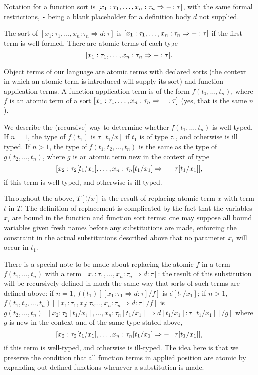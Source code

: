\documentclass[12pt]{article}
\begin{document}
Notation for a function sort is $[x_1:\tau_1,\ldots,x_n:\tau_n \Rightarrow {\tt -}:\tau]$, with the same formal restrictions, {\tt -} being a blank placeholder for a definition body $d$ not supplied.

The sort of $[x_1:\tau_1,\ldots,x_n:\tau_n \Rightarrow d:\tau]$ is $[x_1:\tau_1,\ldots,x_n:\tau_n \Rightarrow {\tt -}:\tau]$ if the first term is well-formed.  There are atomic terms of each type $$[x_1:\tau_1,\ldots,x_n:\tau_n \Rightarrow {\tt -}:\tau].$$

Object terms of our language are atomic terms with declared sorts (the context in which an atomic term is introduced will supply its sort) and function application terms.  A function application term is of the form $f(t_1,\ldots,t_n)$,
where $f$ is an atomic term of a sort $[x_1:\tau_1,\ldots,x_n:\tau_n \Rightarrow {\tt -}:\tau]$ (yes, that is the same $n$).

We describe the (recursive) way to determine whether $f(t_1,\ldots,t_n)$ is well-typed.  If $n=1$,
the type of $f(t_1)$ is $\tau[t_1/x]$ if $t_1$ is of type $\tau_1$, and otherwise is ill typed.  If $n>1$,
the type of $f(t_1,t_2,\ldots,t_n)$ is the same as the type of $g(t_2,\ldots,t_n)$, where $g$ is an atomic term new in the context
of type $$[x_2:\tau_2[t_1/x_1],\ldots,x_n:\tau_n[t_1/x_1]\Rightarrow {\tt -}:\tau[t_1/x_1]],$$ if this term is well-typed, and otherwise is ill-typed.

Throughout the above, $T[t/x]$ is the result of replacing atomic term $x$ with term $t$ in $T$.  The definition of replacement is complicated by the fact that the variables $x_i$ are bound in the function and function sort terms:  one may suppose all bound variables given fresh names before any substitutions are made, enforcing the constraint in the actual substitutions described above that no parameter $x_i$ will occur in $t_1$.

There is a special note to be made about replacing the atomic $f$ in a term $f(t_1,\ldots,t_n)$ with a term 
$[x_1:\tau_1,\ldots,x_n:\tau_n \Rightarrow d:\tau]$:  the result of this substitution will be recursively defined in
much the same way that sorts of such terms are defined above:  if $n=1$, $f(t_1)[[x_1:\tau_1 \Rightarrow d:\tau]/f]$
is $d[t_1/x_1]$;  if $n>1$, $f(t_1,t_2,\ldots,t_n)[[x_1:\tau_1,x_2:\tau_2\ldots, x_n:\tau_n\Rightarrow d:\tau]/f]$
is $g(t_2,\ldots,t_n)[[x_2:\tau_2[t_1/x_1],\ldots, x_n:\tau_n[t_1/x_1]\Rightarrow d[t_1/x_1]:\tau[t_1/x_1]]/g]$  where $g$ is new in the context and of the same type stated above, $$[x_2:\tau_2[t_1/x_1],\ldots,x_n:\tau_n[t_1/x_1]\Rightarrow {\tt -}:\tau[t_1/x_1]],$$ if this term is well-typed, and otherwise is ill-typed.  The idea here is that we preserve the condition that all function terms in applied position are atomic by expanding out defined functions whenever a substitution is made.
\end{document}
